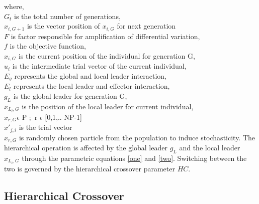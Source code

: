 \documentclass[a4paper,twoside]{article}
\begin{document}
where, \\
$G_{t}$ is the total number of generations,\\
$x_{i,G+1}$ is the vector position of $x_{i,G}$ for next generation\\
$F$ is factor responsible for amplification of differential variation, \\
$f$ is the objective function, \\
$x_{i,G}$ is the current position of the individual for generation G,\\
$u_i$ is the intermediate trial vector of the current individual,\\
$E_g$ represents the global and local leader interaction,\\
$E_l$ represents the local leader and effector interaction,\\
$g_L$ is the global leader for generation G, \\
$x_{L_i,G}$ is the position of the local leader for current individual,\\
$x_{r,G} \epsilon$ P $;$  \thinspace r $\epsilon$ [0,1,.. NP-1] \\
$x'_{j,i}$ is the trial vector\\

$x_{r,G}$ is randomly chosen particle from the population to induce stochasticity. The hierarchical operation is affected by the global leader $g_L$ and the local leader $x_{L_i,G}$  through the parametric equations \eqref{one} and \eqref{two}. Switching between the two is governed by the hierarchical crossover parameter $HC$.


\subsection{Hierarchical Crossover}
\end{document}
